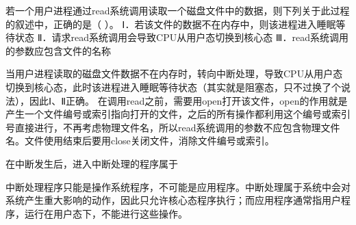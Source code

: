 \question 若一个用户进程通过read系统调用读取一个磁盘文件中的数据，则下列关于此过程的叙述中，正确的是（
）。 Ⅰ．若该文件的数据不在内存中，则该进程进入睡眠等待状态
Ⅱ．请求read系统调用会导致CPU从用户态切换到核心态
Ⅲ．read系统调用的参数应包含文件的名称
\par{}
\begin{solution}当用户进程读取的磁盘文件数据不在内存时，转向中断处理，导致CPU从用户态切换到核心态，此时该进程进入睡眠等待状态（其实就是阻塞态，只不过换了个说法），因此Ⅰ、Ⅱ正确。
在调用read之前，需要用open打开该文件，open的作用就是产生一个文件编号或索引指向打开的文件，之后的所有操作都利用这个编号或索引号直接进行，不再考虑物理文件名，所以read系统调用的参数不应包含物理文件名。文件使用结束后要用close关闭文件，消除文件编号或索引。
\end{solution}
\question 在中断发生后，进入中断处理的程序属于
\par{}
\begin{solution}中断处理程序只能是操作系统程序，不可能是应用程序。中断处理属于系统中会对系统产生重大影响的动作，因此只允许核心态程序执行；而应用程序通常指用户程序，运行在用户态下，不能进行这些操作。
\end{solution}
